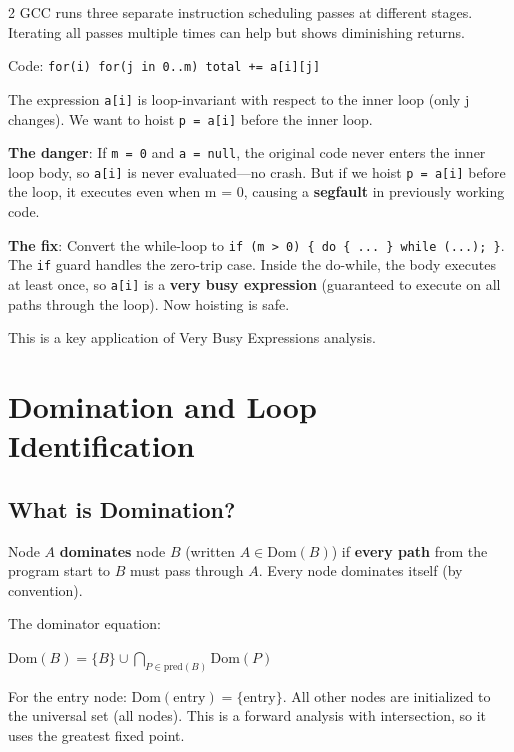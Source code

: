 \documentclass[9pt,landscape]{extarticle}
\begin{document}
\begin{multicols}{2}
GCC runs three separate instruction scheduling passes at different stages. Iterating all passes multiple times can help but shows diminishing returns.

\begin{exambox}
Code: \texttt{for(i) for(j in 0..m) total += a[i][j]}

The expression \texttt{a[i]} is loop-invariant with respect to the inner loop (only j changes). We want to hoist \texttt{p = a[i]} before the inner loop.

\textbf{The danger}: If \texttt{m = 0} and \texttt{a = null}, the original code never enters the inner loop body, so \texttt{a[i]} is never evaluated---no crash. But if we hoist \texttt{p = a[i]} before the loop, it executes even when m = 0, causing a \textbf{segfault} in previously working code.

\textbf{The fix}: Convert the while-loop to \texttt{if (m > 0) \{ do \{ ... \} while (...); \}}. The \texttt{if} guard handles the zero-trip case. Inside the do-while, the body executes at least once, so \texttt{a[i]} is a \textbf{very busy expression} (guaranteed to execute on all paths through the loop). Now hoisting is safe.

This is a key application of Very Busy Expressions analysis.
\end{exambox}

\section{Domination and Loop Identification}

\subsection{What is Domination?}

Node $A$ \textbf{dominates} node $B$ (written $A \in \text{Dom}(B)$) if \textbf{every path} from the program start to $B$ must pass through $A$. Every node dominates itself (by convention).

The dominator equation:

$\text{Dom}(B) = \{B\} \cup \displaystyle\bigcap_{P \in \text{pred}(B)} \text{Dom}(P)$

For the entry node: $\text{Dom}(\text{entry}) = \{\text{entry}\}$. All other nodes are initialized to the universal set (all nodes). This is a forward analysis with intersection, so it uses the greatest fixed point.


\end{multicols}
\end{document}
